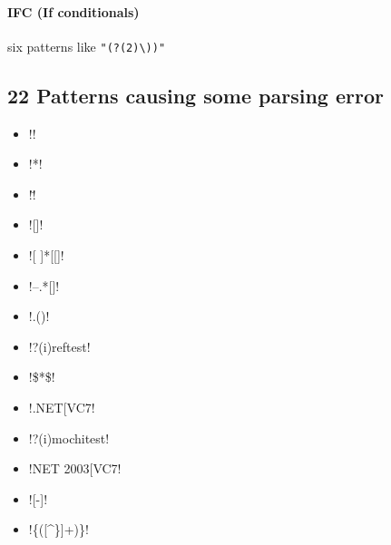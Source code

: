 \paragraph{IFC (If conditionals)} six patterns like \verb!"(?(2)\))"!
\begin{itemize}[noitemsep,topsep=0pt]
\item \cverb!^(\()?([^()]+)(?(1)\))$!
\item \cverb@(?<=[\w)\]"\']|([ ]))(===?|!==?|[<>]=?)(?=[\w({\["\']|(?(1)\b\b|[ ]))@
\item \cverb!(?<=[\w)\]"\']|([ ]))(=|[-+*/%
\item \cverb!(?<=[\w)\]"\']|([ ]))([-+*/%
\item \cverb!([^()]+?)\s*(\()?(\d{4})(?(2)\))$!
\item \cverb@^((?:https?://)?(?:youtu\\.be/|(?:\\w+\\.)?youtube(?:-nocookie)?\\.com/)@\verb!...<107>!
\end{itemize}

\subsection*{22 Patterns causing some parsing error}
\begin{multicols}{2}
\begin{itemize}[noitemsep,topsep=0pt]
\item \cverb!!
\item \cverb!*!
\item \cverb!\u!
\item \cverb![]!
\item \cverb![ \n]*[[]!
\item \cverb!--.*[\n\Z]!
\item \cverb!\here.(\w*)!
\item \cverb!?(i)reftest!
\item \cverb!\$\Id[^$]*\$!
\item \cverb!.NET[\/\]VC7!
\item \cverb!?(i)mochitest!
\item \cverb!NET 2003[\/\]VC7!
\item \cverb![-\udfff]!
\item \cverb!\citation\{([^\}]+)\}!
\end{itemize}
\end{multicols}

